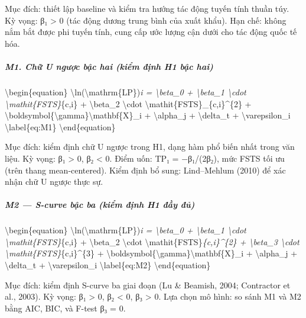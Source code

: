 \documentclass[12pt,a4paper]{article}
\begin{document}
Mục đích: thiết lập baseline và kiểm tra hướng tác động tuyến tính thuần
túy. Kỳ vọng: β₁ \textgreater{} 0 (tác động dương trung bình của xuất
khẩu). Hạn chế: không nắm bắt được phi tuyến tính, cung cấp ước lượng
cận dưới cho tác động quốc tế hóa.

\hypertarget{m1-chux1eef-u-ngux1b0ux1ee3c-bux1eadc-hai-kiux1ec3m-ux111ux1ecbnh-h1-bux1eadc-hai}{%
\subparagraph{M1. Chữ U ngược bậc hai (kiểm định H1 bậc
hai)}\label{m1-chux1eef-u-ngux1b0ux1ee3c-bux1eadc-hai-kiux1ec3m-ux111ux1ecbnh-h1-bux1eadc-hai}}

\textbackslash begin\{equation\}
\textbackslash ln(\textbackslash mathrm\{LP\})\emph{i =
\textbackslash beta\_0 + \textbackslash beta\_1 \textbackslash cdot
\textbackslash mathit\{FSTS\}}\{c,i\} + \textbackslash beta\_2
\textbackslash cdot \textbackslash mathit\{FSTS\}\_\{c,i\}\^{}\{2\} +
\textbackslash boldsymbol\{\textbackslash gamma\}\textquotesingle\textbackslash mathbf\{X\}\_i
+ \textbackslash alpha\_j + \textbackslash delta\_t +
\textbackslash varepsilon\_i \textbackslash label\{eq:M1\}
\textbackslash end\{equation\}

Mục đích: kiểm định chữ U ngược trong H1, dạng hàm phổ biến nhất trong
văn liệu. Kỳ vọng: β₁ \textgreater{} 0, β₂ \textless{} 0. Điểm uốn: TP₁
= −β₁/(2β₂), mức FSTS tối ưu (trên thang mean-centered). Kiểm định bổ
sung: Lind--Mehlum (2010) để xác nhận chữ U ngược thực sự.

\hypertarget{m2--s-curve-bux1eadc-ba-kiux1ec3m-ux111ux1ecbnh-h1-ux111ux1ea7y-ux111ux1ee7}{%
\subparagraph{M2 --- S-curve bậc ba (kiểm định H1 đầy
đủ)}\label{m2--s-curve-bux1eadc-ba-kiux1ec3m-ux111ux1ecbnh-h1-ux111ux1ea7y-ux111ux1ee7}}

\textbackslash begin\{equation\}
\textbackslash ln(\textbackslash mathrm\{LP\})\emph{i =
\textbackslash beta\_0 + \textbackslash beta\_1 \textbackslash cdot
\textbackslash mathit\{FSTS\}}\{c,i\} + \textbackslash beta\_2
\textbackslash cdot \textbackslash mathit\{FSTS\}\emph{\{c,i\}\^{}\{2\}
+ \textbackslash beta\_3 \textbackslash cdot
\textbackslash mathit\{FSTS\}}\{c,i\}\^{}\{3\} +
\textbackslash boldsymbol\{\textbackslash gamma\}\textquotesingle\textbackslash mathbf\{X\}\_i
+ \textbackslash alpha\_j + \textbackslash delta\_t +
\textbackslash varepsilon\_i \textbackslash label\{eq:M2\}
\textbackslash end\{equation\}

Mục đích: kiểm định S-curve ba giai đoạn (Lu \& Beamish, 2004;
Contractor et al., 2003). Kỳ vọng: β₁ \textgreater{} 0, β₂ \textless{}
0, β₃ \textgreater{} 0. Lựa chọn mô hình: so sánh M1 và M2 bằng AIC,
BIC, và F-test β₃ = 0.
\end{document}
